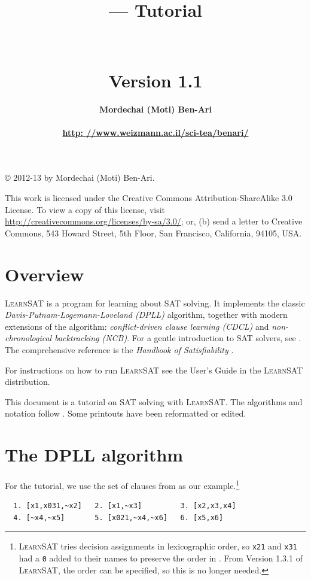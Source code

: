 \documentclass[11pt]{article}
\title{\bfseries \ls --- Tutorial\\\mbox{}\\\mbox{}\\
\bfseries\normalsize Version 1.1}
\author{\bfseries Mordechai (Moti) Ben-Ari\\\mbox{}\\
\url{http: //www.weizmann.ac.il/sci-tea/benari/}}
\newcommand*{\p}[1]{\textup{\texttt{#1}}}
\newcommand*{\ls}{\textsc{LearnSAT}}
\begin{document}
\maketitle

\thispagestyle{empty}

\vspace*{\fill}

\begin{center}
\copyright{} 2012-13 by Mordechai (Moti) Ben-Ari.
\end{center}
This work is licensed under the Creative Commons Attribution-ShareAlike 3.0
License. To view a copy of this license, visit
\url{http://creativecommons.org/licenses/by-sa/3.0/}; or, (b) send a letter
to Creative Commons, 543 Howard Street, 5th Floor, San Francisco,
California, 94105, USA.

\newpage

\section{Overview}

\ls{} is a program for learning about SAT solving. It implements the
classic \emph{Davis-Putnam-Logemann-Loveland (DPLL)} algorithm, together
with modern extensions of the algorithm: \emph{conflict-driven clause
learning (CDCL)} and \emph{non-chronological backtracking (NCB)}. For a
gentle introduction to SAT solvers, see \cite[Chapter~6]{mlcs}. The
comprehensive reference is the \emph{Handbook of Satisfiability}
\cite{SAT}.

For instructions on how to run \ls{} see the User's Guide in the \ls{}
distribution.

This document is a tutorial on SAT solving with \ls{}. The algorithms
and notation follow \cite{mlm}. Some printouts have been reformatted or
edited.

\section{The DPLL algorithm}

For the tutorial, we use the set of clauses from \cite{mlm} as our
example.\footnote{\ls{} tries decision assignments in lexicographic
order, so \p{x21} and \p{x31} had a \p{0} added to their names to
preserve the order in \cite{mlm}. From Version 1.3.1 of \ls{}, the order
can be specified, so this is no longer needed.}

\begin{verbatim}
  1. [x1,x031,~x2]   2. [x1,~x3]         3. [x2,x3,x4]
  4. [~x4,~x5]       5. [x021,~x4,~x6]   6. [x5,x6]
\end{verbatim}
\end{document}
